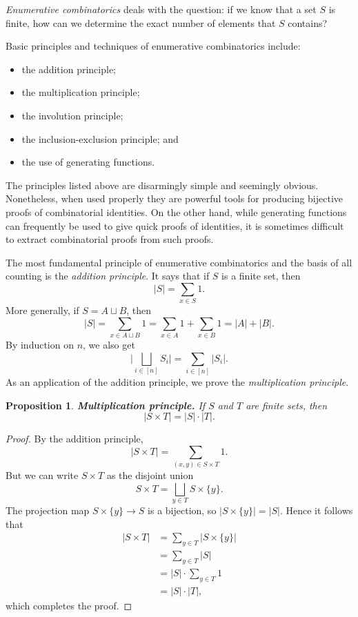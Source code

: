 \documentclass[12pt]{article}
\newtheorem{proposition}{Proposition}
\theoremstyle{remark}
\begin{document}
\emph{Enumerative combinatorics} deals with the question: if we know
that a set $S$ is finite, how can we determine the exact number of
elements that $S$ contains?  

Basic principles and techniques of enumerative combinatorics include:
\begin{itemize}
\item
the addition principle;

\item
the multiplication principle;

\item
the involution principle;

\item
the inclusion-exclusion principle; and

\item
the use of generating functions.
\end{itemize}

The principles listed above are disarmingly simple and seemingly
obvious.  Nonetheless, when used properly they are powerful
tools for producing bijective proofs of combinatorial identities.  On
the other hand, while generating functions can frequently be used to
give quick proofs of identities, it is sometimes difficult to extract
combinatorial proofs from such proofs.

The most fundamental principle of enumerative combinatorics and the
basis of all counting is the \emph{addition principle}.  It says that
if $S$ is a finite set, then
\[
|S| = \sum_{x\in S} 1.
\]
More generally, if $S=A\sqcup B$, then 
\[
|S| = \sum_{x\in A\sqcup B} 1= \sum_{x\in A} 1 + \sum_{x\in B} 1 = |A| + |B|.
\]
By induction on $n$, we also get
\[
\biggl|\bigsqcup_{i\in[n]} S_i\biggr| = \sum_{i\in[n]} |S_i|.
\]
As an application of the addition principle, we prove the
\emph{multiplication principle}.

\begin{proposition}
{\bf Multiplication principle.} If $S$ and $T$ are finite sets, then
\[
|S\times T| = |S|\cdot |T|.
\]
\end{proposition}

\begin{proof}
By the addition principle,
\[
|S\times T| = \sum_{(x,y)\in S\times T} 1.
\]
But we can write $S\times T$ as the disjoint union
\[
S\times T = \bigsqcup_{y\in T} S\times\{y\}.
\]
The projection map $S\times\{y\}\to S$ is a bijection, so
$|S\times\{y\}|=|S|$.  Hence it follows that
\begin{align*}
|S\times T| 
&= \sum_{y\in T} |S\times\{y\}| \\
&= \sum_{y\in T} |S| \\
&= |S|\cdot\sum_{y\in T} 1 \\
&= |S|\cdot |T|,
\end{align*}
which completes the proof.
\end{proof}
\end{document}

